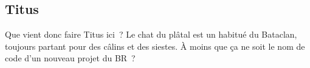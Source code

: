 \subsection{Titus}

\label{titus}
Que vient donc faire Titus ici~? Le chat du plâtal est un habitué du Bataclan, toujours partant pour des câlins et des siestes. À moins que ça ne soit le nom de code d'un nouveau projet du BR~?
